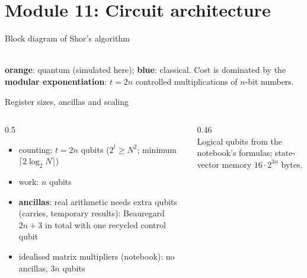 \documentclass[aspectratio=169,11pt]{beamer}
\newcommand{\key}[1]{{\color{qdark}\textbf{#1}}}
\begin{document}
\section{Module 11: Circuit architecture}
\begin{frame}[label=fBlocks]{Block diagram of Shor's algorithm}
  \centering
  \\[4pt]
  \small {\color{qorange}\textbf{orange}}: quantum (simulated here); {\color{qblue}\textbf{blue}}: classical. Cost is dominated by the
  \key{modular exponentiation}: $t = 2n$ controlled multiplications of $n$-bit numbers.
\end{frame}

\begin{frame}[label=fRegSize]{Register sizes, ancillas and scaling}
  \begin{columns}[T]
    \begin{column}{0.5\textwidth}
      \small
      \begin{itemize}\itemsep1pt
        \item counting: $t = 2n$ qubits ($2^t \ge N^2$; minimum $\lceil2\log_2N\rceil$)
        \item work: $n$ qubits
        \item \key{ancillas}: real arithmetic needs extra qubits (carries, temporary results): Beauregard $2n + 3$ in total with one recycled control qubit
        \item idealised matrix multipliers (notebook): no ancillas, $3n$ qubits
      \end{itemize}
    \end{column}
    \begin{column}{0.46\textwidth}
      \centering
      \resizebox{\linewidth}{!}{}\\[2pt]
      \scriptsize Logical qubits from the notebook's formulas; state-vector memory $16\cdot2^{3n}$ bytes.
    \end{column}
  \end{columns}
\end{frame}
\end{document}
